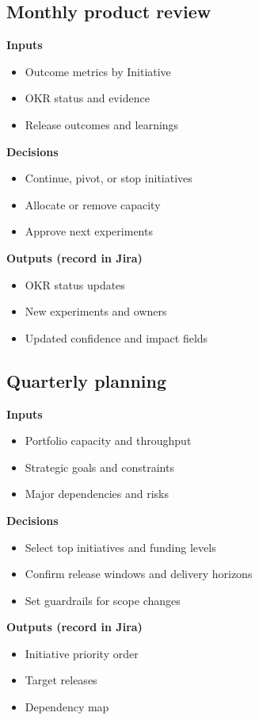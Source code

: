 \subsection*{Monthly product review}
\textbf{Inputs}
\begin{itemize}
  \item Outcome metrics by Initiative
  \item OKR status and evidence
  \item Release outcomes and learnings
\end{itemize}

\textbf{Decisions}
\begin{itemize}
  \item Continue, pivot, or stop initiatives
  \item Allocate or remove capacity
  \item Approve next experiments
\end{itemize}

\textbf{Outputs (record in Jira)}
\begin{itemize}
  \item OKR status updates
  \item New experiments and owners
  \item Updated confidence and impact fields
\end{itemize}

\subsection*{Quarterly planning}
\textbf{Inputs}
\begin{itemize}
  \item Portfolio capacity and throughput
  \item Strategic goals and constraints
  \item Major dependencies and risks
\end{itemize}

\textbf{Decisions}
\begin{itemize}
  \item Select top initiatives and funding levels
  \item Confirm release windows and delivery horizons
  \item Set guardrails for scope changes
\end{itemize}

\textbf{Outputs (record in Jira)}
\begin{itemize}
  \item Initiative priority order
  \item Target releases
  \item Dependency map
\end{itemize}

